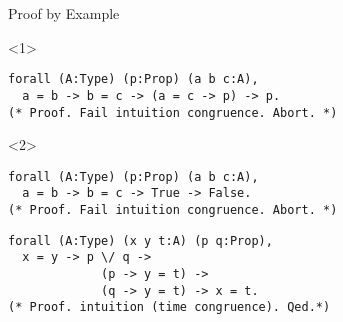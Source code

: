 \documentclass{beamer}
\begin{document}
\begin{frame}[fragile]{Proof by Example}


\begin{onlyenv}<1>
\begin{verbatim}
forall (A:Type) (p:Prop) (a b c:A),
  a = b -> b = c -> (a = c -> p) -> p.
(* Proof. Fail intuition congruence. Abort. *)
\end{verbatim}
\end{onlyenv}
\begin{onlyenv}<2>
\begin{verbatim}
forall (A:Type) (p:Prop) (a b c:A),
  a = b -> b = c -> True -> False.
(* Proof. Fail intuition congruence. Abort. *)
\end{verbatim}
\end{onlyenv}


\bigskip

\begin{verbatim}
forall (A:Type) (x y t:A) (p q:Prop),
  x = y -> p \/ q ->
             (p -> y = t) ->
             (q -> y = t) -> x = t.
(* Proof. intuition (time congruence). Qed.*)
\end{verbatim}

\end{frame}
\end{document}
